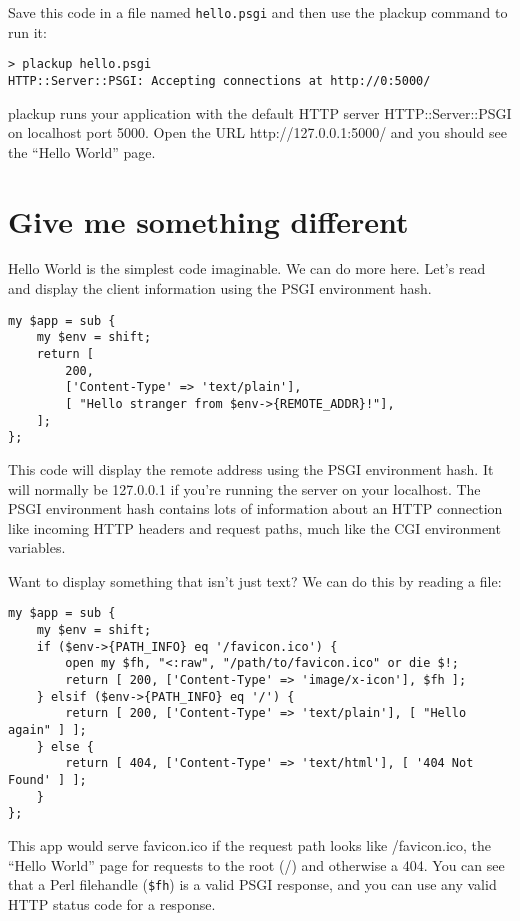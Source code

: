 Save this code in a file named \lstinline!hello.psgi! and then use the
plackup command to run it:

\begin{lstlisting}
> plackup hello.psgi
HTTP::Server::PSGI: Accepting connections at http://0:5000/
\end{lstlisting}

plackup runs your application with the default HTTP server
HTTP::Server::PSGI on localhost port 5000. Open the URL
http://127.0.0.1:5000/ and you should see the ``Hello World'' page.

\section{Give me something
different}\label{give-me-something-different}

Hello World is the simplest code imaginable. We can do more here. Let's
read and display the client information using the PSGI environment hash.

\begin{lstlisting}
my $app = sub {
    my $env = shift;
    return [
        200,
        ['Content-Type' => 'text/plain'],
        [ "Hello stranger from $env->{REMOTE_ADDR}!"],
    ];
};
\end{lstlisting}

This code will display the remote address using the PSGI environment
hash. It will normally be 127.0.0.1 if you're running the server on your
localhost. The PSGI environment hash contains lots of information about
an HTTP connection like incoming HTTP headers and request paths, much
like the CGI environment variables.

Want to display something that isn't just text? We can do this by
reading a file:

\begin{lstlisting}
my $app = sub {
    my $env = shift;
    if ($env->{PATH_INFO} eq '/favicon.ico') {
        open my $fh, "<:raw", "/path/to/favicon.ico" or die $!;
        return [ 200, ['Content-Type' => 'image/x-icon'], $fh ];
    } elsif ($env->{PATH_INFO} eq '/') {
        return [ 200, ['Content-Type' => 'text/plain'], [ "Hello again" ] ];
    } else {
        return [ 404, ['Content-Type' => 'text/html'], [ '404 Not Found' ] ];
    }
};
\end{lstlisting}

This app would serve favicon.ico if the request path looks like
/favicon.ico, the ``Hello World'' page for requests to the root (/) and
otherwise a 404. You can see that a Perl filehandle (\lstinline!$fh!) is
a valid PSGI response, and you can use any valid HTTP status code for a
response.

